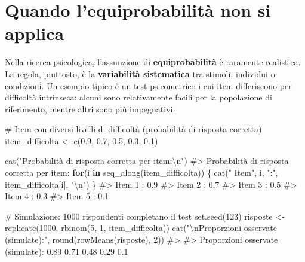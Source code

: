 \documentclass[
  letterpaper,
  DIV=11,
  numbers=noendperiod,
  oneside]{scrreprt}
\newenvironment{Shaded}{\begin{snugshade}}{\end{snugshade}}
\newcommand{\CommentTok}[1]{\textcolor[rgb]{0.37,0.37,0.37}{#1}}
\newcommand{\ControlFlowTok}[1]{\textcolor[rgb]{0.00,0.23,0.31}{\textbf{#1}}}
\newcommand{\DecValTok}[1]{\textcolor[rgb]{0.68,0.00,0.00}{#1}}
\newcommand{\FloatTok}[1]{\textcolor[rgb]{0.68,0.00,0.00}{#1}}
\newcommand{\FunctionTok}[1]{\textcolor[rgb]{0.28,0.35,0.67}{#1}}
\newcommand{\NormalTok}[1]{\textcolor[rgb]{0.00,0.23,0.31}{#1}}
\newcommand{\OtherTok}[1]{\textcolor[rgb]{0.00,0.23,0.31}{#1}}
\newcommand{\SpecialCharTok}[1]{\textcolor[rgb]{0.37,0.37,0.37}{#1}}
\newcommand{\StringTok}[1]{\textcolor[rgb]{0.13,0.47,0.30}{#1}}
\theoremstyle{definition}
\theoremstyle{plain}
\theoremstyle{definition}
\theoremstyle{remark}
\begin{document}
\section{Quando l'equiprobabilità non si
applica}\label{quando-lequiprobabilituxe0-non-si-applica}

Nella ricerca psicologica, l'assunzione di \textbf{equiprobabilità} è
raramente realistica. La regola, piuttosto, è la \textbf{variabilità
sistematica} tra stimoli, individui o condizioni. Un esempio tipico è un
test psicometrico i cui item differiscono per difficoltà intrinseca:
alcuni sono relativamente facili per la popolazione di riferimento,
mentre altri sono più impegnativi.

\begin{Shaded}
\begin{Highlighting}[]
\CommentTok{\# Item con diversi livelli di difficoltà (probabilità di risposta corretta)}
\NormalTok{item\_difficolta }\OtherTok{\textless{}{-}} \FunctionTok{c}\NormalTok{(}\FloatTok{0.9}\NormalTok{, }\FloatTok{0.7}\NormalTok{, }\FloatTok{0.5}\NormalTok{, }\FloatTok{0.3}\NormalTok{, }\FloatTok{0.1}\NormalTok{)}

\FunctionTok{cat}\NormalTok{(}\StringTok{"Probabilità di risposta corretta per item:}\SpecialCharTok{\textbackslash{}n}\StringTok{"}\NormalTok{)}
\CommentTok{\#\textgreater{} Probabilità di risposta corretta per item:}
\ControlFlowTok{for}\NormalTok{(i }\ControlFlowTok{in} \FunctionTok{seq\_along}\NormalTok{(item\_difficolta)) \{}
  \FunctionTok{cat}\NormalTok{(}\StringTok{"  Item"}\NormalTok{, i, }\StringTok{":"}\NormalTok{, item\_difficolta[i], }\StringTok{"}\SpecialCharTok{\textbackslash{}n}\StringTok{"}\NormalTok{)}
\NormalTok{\}}
\CommentTok{\#\textgreater{}   Item 1 : 0.9 }
\CommentTok{\#\textgreater{}   Item 2 : 0.7 }
\CommentTok{\#\textgreater{}   Item 3 : 0.5 }
\CommentTok{\#\textgreater{}   Item 4 : 0.3 }
\CommentTok{\#\textgreater{}   Item 5 : 0.1}

\CommentTok{\# Simulazione: 1000 rispondenti completano il test}
\FunctionTok{set.seed}\NormalTok{(}\DecValTok{123}\NormalTok{)}
\NormalTok{risposte }\OtherTok{\textless{}{-}} \FunctionTok{replicate}\NormalTok{(}\DecValTok{1000}\NormalTok{, }\FunctionTok{rbinom}\NormalTok{(}\DecValTok{5}\NormalTok{, }\DecValTok{1}\NormalTok{, item\_difficolta))}
\FunctionTok{cat}\NormalTok{(}\StringTok{"}\SpecialCharTok{\textbackslash{}n}\StringTok{Proporzioni osservate (simulate):"}\NormalTok{, }\FunctionTok{round}\NormalTok{(}\FunctionTok{rowMeans}\NormalTok{(risposte), }\DecValTok{2}\NormalTok{))}
\CommentTok{\#\textgreater{} }
\CommentTok{\#\textgreater{} Proporzioni osservate (simulate): 0.89 0.71 0.48 0.29 0.1}
\end{Highlighting}
\end{Shaded}
\end{document}
